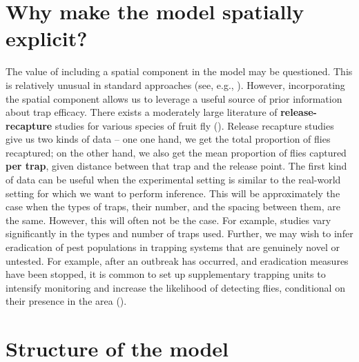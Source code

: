 \documentclass[
  oneside]{book}
\begin{document}
\hypertarget{why-make-the-model-spatially-explicit}{%
\section{Why make the model spatially explicit?}\label{why-make-the-model-spatially-explicit}}

The value of including a spatial component in the model may be questioned. This is relatively unusual in standard approaches (see, e.g., \citet{mcardle1990}). However, incorporating the spatial component allows us to leverage a useful source of prior information about trap efficacy. There exists a moderately large literature of \textbf{release-recapture} studies for various species of fruit fly (\citet{todocite}). Release recapture studies give us two kinds of data -- one one hand, we get the total proportion of flies recaptured; on the other hand, we also get the mean proportion of flies captured \textbf{per trap}, given distance between that trap and the release point. The first kind of data can be useful when the experimental setting is similar to the real-world setting for which we want to perform inference. This will be approximately the case when the types of traps, their number, and the spacing between them, are the same. However, this will often not be the case. For example, studies vary significantly in the types and number of traps used. Further, we may wish to infer eradication of pest populations in trapping systems that are genuinely novel or untested. For example, after an outbreak has occurred, and eradication measures have been stopped, it is common to set up supplementary trapping units to intensify monitoring and increase the likelihood of detecting flies, conditional on their presence in the area (\citet{supp_traps}).

\hypertarget{structure-of-the-model}{%
\section{Structure of the model}\label{structure-of-the-model}}
\end{document}
